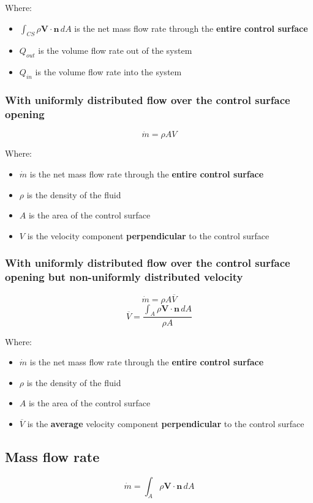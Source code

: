 \documentclass[11pt]{article}
\begin{document}
Where:
\begin{itemize}
\item \(\int_{CS} \rho \boldsymbol{V} \cdot \boldsymbol{n} \, dA\) is the net mass flow rate through the \textbf{entire control surface}
\item \(Q_{out}\) is the volume flow rate out of the system
\item \(Q_{in}\) is the volume flow rate into the system
\end{itemize}
\subsubsection{With uniformly distributed flow over the control surface opening}
\label{sec:org978fac2}
\[\dot{m} = \rho A V\]

Where:
\begin{itemize}
\item \(\dot{m}\) is the net mass flow rate through the \textbf{entire control surface}
\item \(\rho\) is the density of the fluid
\item \(A\) is the area of the control surface
\item \(V\) is the velocity component \textbf{perpendicular} to the control surface
\end{itemize}
\subsubsection{With uniformly distributed flow over the control surface opening but non-uniformly distributed velocity}
\label{sec:orgf040dc8}
\[\dot{m} = \rho A \overline{V}\]
\[\overline{V} = \frac{\int_A \rho \boldsymbol{V} \cdot \boldsymbol{n} \, dA}{\rho A}\]

Where:
\begin{itemize}
\item \(\dot{m}\) is the net mass flow rate through the \textbf{entire control surface}
\item \(\rho\) is the density of the fluid
\item \(A\) is the area of the control surface
\item \(\overline{V}\) is the \textbf{average} velocity component \textbf{perpendicular} to the control surface
\end{itemize}
\subsection{Mass flow rate}
\label{sec:org44d0ef4}
\[\dot{m} = \int_A \rho \boldsymbol{V} \cdot \boldsymbol{n} \, dA\]
\end{document}
